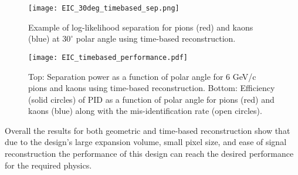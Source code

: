 \begin{figure}[!htb]
	\centering
	\texttt{[image: EIC\_30deg\_timebased\_sep.png]}
	\caption{Example of log-likelihood separation for pions (red) and kaons (blue) at $30^\circ$ polar angle using time-based reconstruction.}
	\label{fig:EIC_timebased_ex}
\end{figure}

\begin{figure}[!htb]
	\centering
	\texttt{[image: EIC\_timebased\_performance.pdf]}
	\caption{Top: Separation power as a function of polar angle for 6 GeV/c pions and kaons using time-based reconstruction. Bottom: Efficiency (solid circles) of PID as a function of polar angle for pions (red) and kaons (blue) along with the mis-identification rate (open circles).}
	\label{fig:EIC_timebased_performance}
\end{figure}

Overall the results for both geometric and time-based reconstruction show that due to the design's large expansion volume, small pixel size, and ease of signal reconstruction the performance of this design can reach the desired performance for the required physics.
